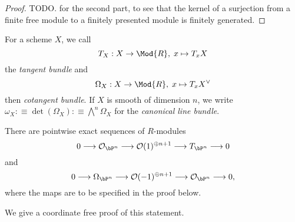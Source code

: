 \begin{proof}
TODO.
\cite[Chapter IV, 1.0 Lemma]{lombardi-quitte} for the second part, to see that the kernel of a surjection from a finite free module to a finitely presented module is finitely generated.
\end{proof}

\begin{definition}
  For a scheme $X$, we call
  \[
    T_X : X \to \Mod{R},\; x \mapsto T_xX
  \]
  the \emph{tangent bundle} and
  \[
    \Omega_X : X \to \Mod{R},\; x \mapsto T_xX^\vee
  \]
  then \emph{cotangent bundle}.
  If $X$ is smooth of dimension $n$, we write $\omega_X :\equiv \det(\Omega_X) :\equiv \bigwedge^n\Omega_X$ for the  \emph{canonical line bundle}.
\end{definition}

\begin{lemma}
  There are pointwise exact sequences of $R$-modules
  \[
    0 \longrightarrow
    \mathcal O_{\bP^n} \longrightarrow
    \mathcal O(1)^{\oplus n+1} \longrightarrow
    T_{\bP^n} \longrightarrow
    0
  \]
  and
  \[
    0 \longrightarrow
    \Omega_{\bP^n} \longrightarrow
    \mathcal O(-1)^{\oplus n+1} \longrightarrow
    \mathcal O_{\bP^n} \longrightarrow
    0,
  \]
  where the maps are to be specified in the proof below.
\end{lemma}

  We give a coordinate free proof of this statement.

